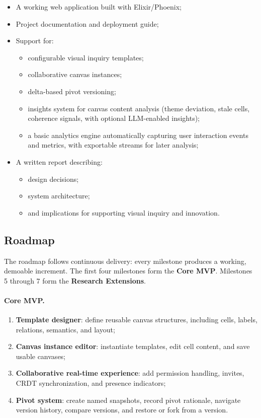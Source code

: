 \documentclass[11pt,a4paper]{article}
\begin{document}
\begin{itemize}
  \item A working web application built with Elixir/Phoenix;
  \item Project documentation and deployment guide;
  \item Support for:
  \begin{itemize}
    \item configurable visual inquiry templates;
    \item collaborative canvas instances;
    \item delta-based pivot versioning;
    \item insights system for canvas content analysis (theme deviation, stale cells, coherence signals, with optional LLM-enabled insights);
    \item a basic analytics engine automatically capturing user interaction events and metrics, with exportable streams for later analysis;
  \end{itemize}
  \item A written report describing:
  \begin{itemize}
    \item design decisions;
    \item system architecture;
    \item and implications for supporting visual inquiry and innovation.
  \end{itemize}
\end{itemize}

\subsection{Roadmap}

The roadmap follows continuous delivery: every milestone produces a working, demoable increment. The first four milestones form the \textbf{Core MVP}. Milestones 5 through 7 form the \textbf{Research Extensions}.

\paragraph{Core MVP.}
\begin{enumerate}
  \item \textbf{Template designer}: define reusable canvas structures, including cells, labels, relations, semantics, and layout;
  \item \textbf{Canvas instance editor}: instantiate templates, edit cell content, and save usable canvases;
  \item \textbf{Collaborative real-time experience}: add permission handling, invites, CRDT synchronization, and presence indicators;
  \item \textbf{Pivot system}: create named snapshots, record pivot rationale, navigate version history, compare versions, and restore or fork from a version.
\end{enumerate}
\end{document}
